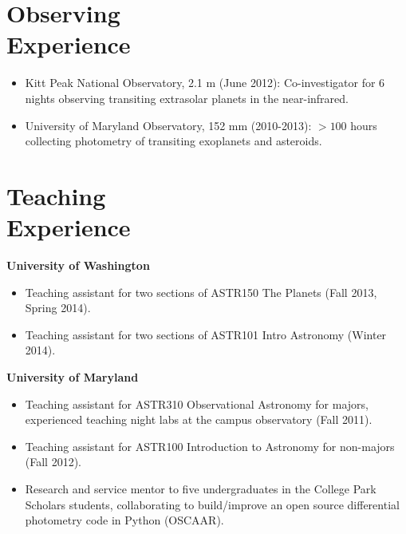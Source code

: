 \documentclass[margin]{res}
\begin{document}
\begin{resume}
\section{Observing \\Experience}
            \begin{itemize}   
            \item Kitt Peak National Observatory, 2.1 m (June 2012): Co-investigator for 6 nights observing transiting extrasolar planets in the near-infrared.
            \item University of Maryland Observatory, 152 mm (2010-2013): $>100$ hours collecting photometry of transiting exoplanets and asteroids. \\
            \end{itemize}
                 
\section{Teaching \\Experience}
	     \textbf{University of Washington}
            \begin{itemize}   
            \item Teaching assistant for two sections of ASTR150 The Planets (Fall 2013, Spring 2014).
            \item Teaching assistant for two sections of ASTR101 Intro Astronomy (Winter 2014). 
            \end{itemize}
	     \textbf{University of Maryland}
            \begin{itemize}   
            \item Teaching assistant for ASTR310 Observational Astronomy for majors, experienced teaching night labs at the campus observatory (Fall 2011).
            \item Teaching assistant for ASTR100 Introduction to Astronomy for non-majors (Fall 2012).
            \item Research and service mentor to five undergraduates in the College Park Scholars students, collaborating to build/improve an open source differential photometry code in Python (OSCAAR). \\
            \end{itemize}
            

\end{resume}
\end{document}

